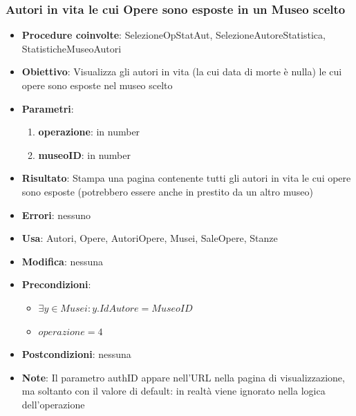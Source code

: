 \subsubsection{Autori in vita le cui Opere sono esposte in un Museo scelto}
\begin{itemize}
	\item \textbf{Procedure coinvolte}: SelezioneOpStatAut, SelezioneAutoreStatistica, 
	StatisticheMuseoAutori
	\item \textbf{Obiettivo}: Visualizza gli autori in vita (la cui data di morte è nulla)
	le cui opere sono esposte nel museo scelto
	\item \textbf{Parametri}:
	\begin{enumerate}
		\item \textbf{operazione}: in number
		\item \textbf{museoID}: in number
	\end{enumerate}
	\item \textbf{Risultato}: Stampa una pagina contenente tutti gli autori in vita
	 le cui opere sono esposte (potrebbero essere anche in prestito da un altro museo) 
	\item \textbf{Errori}: nessuno
	\item \textbf{Usa}: Autori, Opere, AutoriOpere, Musei, SaleOpere, Stanze
	\item \textbf{Modifica}: nessuna
	\item \textbf{Precondizioni}:
	\begin{itemize}
		\item $\exists y \in Musei : y.IdAutore = MuseoID$
		\item $operazione  = 4$
	\end{itemize}
	\item \textbf{Postcondizioni}: nessuna
	\item \textbf{Note}: Il parametro authID appare nell'URL nella pagina di 
	visualizzazione, ma soltanto con il valore di default: in realtà viene ignorato nella 
	logica dell'operazione
\end{itemize}

